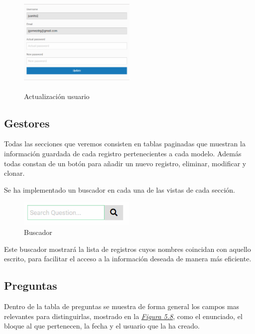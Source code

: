 \begin{figure}[!ht]
    \centering
    \includegraphics[width=0.5\textwidth, height=5cm]{imagenes/actualizacion_usuario.png}
    \caption{ Actualización usuario }
    \label{fig:modify-user}
\end{figure}\vspace{0.5cm} 




\subsection{Gestores}


Todas las secciones que veremos consisten en tablas paginadas que muestran la información guardada de cada registro pertenecientes a cada modelo. Además todas constan de un botón para añadir un nuevo registro, eliminar, modificar y clonar. \vspace{0.3cm}

Se ha implementado un buscador en cada una de las vistas de cada sección.

\begin{figure}[!ht]
    \centering
    \includegraphics[width=0.5\textwidth]{imagenes/search.png}
    \caption{ Buscador }
    \label{fig:enter-label}
\end{figure}

Este buscador mostrará la lista de registros cuyos nombres coincidan con aquello escrito, para facilitar el acceso a la información deseada de manera más eficiente.

\subsection{Preguntas}


Dentro de la tabla de preguntas se muestra de forma general los campos mas relevantes para distinguirlas, mostrado en la \textit{\hyperref[fig:vista-preguntas]{Figura 5.8}}, como el enunciado, el bloque al que pertenecen, la fecha y el usuario que la ha creado. 

